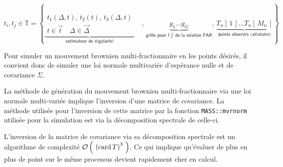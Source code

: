\begin{equation*}
	t_i, t_j \in
	\mathds T = \left\{
	\underbrace{
		\begin{array}{c}
			t_1(\Delta, t), \, t_2(t), \, t_3(\Delta, t )
			\\
			t \in \vec t \quad \Delta \in \overrightarrow \Delta
		\end{array}
	}_{
	\textsf{estimateur de régularité}
	}
	\quad , \,
	\underbrace{
		g_1 \dots g_G
	}_{
	\textsf{grille pour l'} \int \textsf{ de la relation FAR}
	}
	, \,
	\underbrace{
	T_n[\,1\,] \dots T_n[\,M_n\,]
	}_{
	\textsf{points observés (aléatoire)}
	}
	\right\}
\end{equation*}

Pour simuler un mouvement brownien multi-fractionnaire en les points désirés, il convient donc de simuler une loi normale multivariée d'espérance nulle et de covariance $\Sigma$.

\begin{rem}
	La méthode de génération du mouvement brownien multi-fractionnaire via une loi normale multi-variée implique l'inversion d'une matrice de covariance. La méthode utilisée pour l'inversion de cette matrice par la fonction \texttt{MASS::mvrnorm} utilisée pour la simulation est via la décomposition spectrale de celle-ci.

	L'inversion de la matrice de covariance via sa décomposition spectrale est un algorithme de complexité ${\mathcal O} \left( \ {(\operatorname{card}T)}^3 \ \right)$. Ce qui implique qu'évaluer de plus en plus de point sur le même processus devient rapidement cher en calcul.
	\label{rem:inversion_matrice_covariance_mfbm_informel}
\end{rem}
